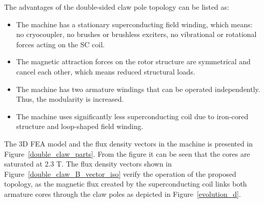 \documentclass[12pt]{iopart}
\begin{document}
The advantages of the double-sided claw pole topology can be listed as:

\begin{itemize}
  \item The machine has a stationary superconducting field winding, which means: no cryocoupler, no brushes or brushless exciters, no vibrational or rotational forces acting on the SC coil.
  \item The magnetic attraction forces on the rotor structure are symmetrical and cancel each other, which means reduced structural loads.
  \item The machine has two armature windings that can be operated independently. Thus, the modularity is increased.
  \item The machine uses significantly less superconducting coil due to iron-cored structure and loop-shaped field winding.
\end{itemize}

The 3D FEA model and the flux density vectors in the machine is presented in Figure~\ref{double_claw_parts}. From the figure it can be seen that the cores are saturated at 2.3 T. The flux density vectors shown in Figure~\ref{double_claw_B_vector_iso} verify the operation of the proposed topology, as the magnetic flux created by the superconducting coil links both armature cores through the claw poles as depicted in Figure~\ref{evolution_d}.
\end{document}
